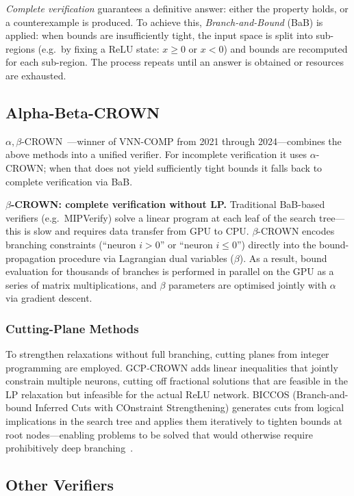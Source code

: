 \textit{Complete verification} guarantees a definitive answer: either the
property holds, or a counterexample is produced. To achieve this,
\textit{Branch-and-Bound} (BaB) is applied: when bounds are insufficiently
tight, the input space is split into sub-regions (e.g.\ by fixing a ReLU state:
$x \geq 0$ or $x < 0$) and bounds are recomputed for each sub-region. The
process repeats until an answer is obtained or resources are exhausted.

\subsection{Alpha-Beta-CROWN}

$\alpha,\beta$-CROWN~\cite{AlphaBetaCrownVNNCOMP23}---winner of VNN-COMP
from 2021 through 2024---combines the above methods into a unified verifier.
For incomplete verification it uses $\alpha$-CROWN; when that does not yield
sufficiently tight bounds it falls back to complete verification via BaB.

\textbf{$\beta$-CROWN: complete verification without LP.}
Traditional BaB-based verifiers (e.g.\ MIPVerify) solve a linear program at
each leaf of the search tree---this is slow and requires data transfer from GPU
to CPU. $\beta$-CROWN encodes branching constraints (``neuron $i > 0$'' or
``neuron $i \leq 0$'') directly into the bound-propagation procedure via
Lagrangian dual variables ($\beta$). As a result, bound evaluation for
thousands of branches is performed in parallel on the GPU as a series of
matrix multiplications, and $\beta$ parameters are optimised jointly with
$\alpha$ via gradient descent.

\subsubsection{Cutting-Plane Methods}

To strengthen relaxations without full branching, cutting planes from integer
programming are employed. GCP-CROWN adds linear inequalities that jointly
constrain multiple neurons, cutting off fractional solutions that are feasible
in the LP relaxation but infeasible for the actual ReLU network. BICCOS
(Branch-and-bound Inferred Cuts with COnstraint Strengthening) generates cuts
from logical implications in the search tree and applies them iteratively to
tighten bounds at root nodes---enabling problems to be solved that would
otherwise require prohibitively deep
branching~\cite{AutoLiRPAPracticeSlides}.

\subsection{Other Verifiers}

